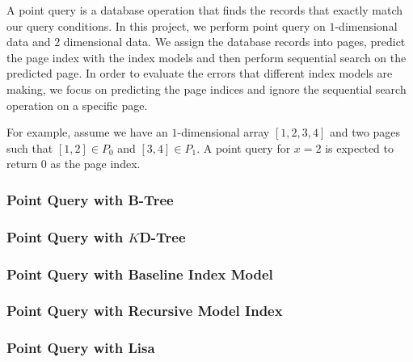 A point query is a database operation that finds the records that exactly match our query conditions. In this project, we perform point query on $1$-dimensional data and $2$ dimensional data. We assign the database records into pages, predict the page index with the index models and then perform sequential search on the predicted page. In order to evaluate the errors that different index models are making, we focus on predicting the page indices and ignore the sequential search operation on a specific page. 

\begin{mscexample}
For example, assume we have an $1$-dimensional array $[1,2,3,4]$ and two pages such that $[1,2]\in P_0$ and $[3,4]\in P_1$. A point query for $x=2$ is expected to return 0 as the page index.
\end{mscexample}

\subsubsection{Point Query with B-Tree}



\subsubsection{Point Query with $K$D-Tree}



\subsubsection{Point Query with Baseline Index Model}



\subsubsection{Point Query with Recursive Model Index}



\subsubsection{Point Query with Lisa}



